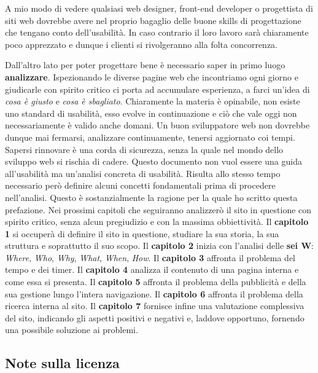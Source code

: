 A mio modo di vedere qualsiasi web designer, front-end developer o progettista di siti web dovrebbe avere nel proprio bagaglio delle buone skills di progettazione che tengano conto dell'usabilità. In caso contrario il loro lavoro sarà chiaramente poco apprezzato e dunque i clienti si rivolgeranno alla folta concorrenza.

Dall'altro lato per poter progettare bene è necessario saper in primo luogo \textbf{analizzare}. Ispezionando le diverse pagine web che incontriamo ogni giorno e giudicarle con spirito critico ci porta ad accumulare esperienza, a farci un'idea di \textit{cosa è giusto} e \textit{cosa è sbagliato}. Chiaramente la materia è opinabile, non esiste uno standard di usabilità, esso evolve in continuazione e ciò che vale oggi non necessariamente è valido anche domani. Un buon sviluppatore web non dovrebbe dunque mai fermarsi, analizzare continuamente, tenersi aggiornato coi tempi. Sapersi rinnovare è una corda di sicurezza, senza la quale nel mondo dello sviluppo web si rischia di cadere.
\linebreak
\linebreak
Questo documento non vuol essere una guida all'usabilità ma un'analisi concreta di usabilità. Risulta allo stesso tempo necessario però definire alcuni concetti fondamentali prima di procedere nell'analisi. Questo è sostanzialmente la ragione per la quale ho scritto questa prefazione. Nei prossimi capitoli che seguiranno analizzerò il sito in questione con spirito critico, senza alcun pregiudizio e con la massima obbiettività. Il \textbf{capitolo 1} si occuperà di definire il sito in questione, studiare la sua storia, la sua struttura e soprattutto il suo scopo. Il \textbf{capitolo 2} inizia con l'analisi delle \textbf{sei W}: \textit{Where}, \textit{Who}, \textit{Why}, \textit{What}, \textit{When}, \textit{How}. Il \textbf{capitolo 3} affronta il problema del tempo e dei timer. Il \textbf{capitolo 4} analizza il contenuto di una pagina interna e come essa si presenta. Il \textbf{capitolo 5} affronta il problema della pubblicità e della sua gestione lungo l'intera navigazione. Il \textbf{capitolo 6} affronta il problema della ricerca interna al sito. Il \textbf{capitolo 7} fornisce infine una valutazione complessiva del sito, indicando gli aspetti positivi e negativi e, laddove opportuno, fornendo una possibile soluzione ai problemi. 

\subsection*{Note sulla licenza}

